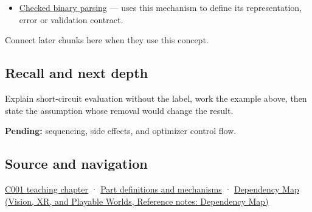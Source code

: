 \hypertarget{appendix-2e245a6fa8d3-used-by}{}

\begin{itemize}
\tightlist
\item
  \hyperref[appendix-652d81568de9]{Checked binary parsing} --- uses this mechanism to define its representation, error or validation contract.
\end{itemize}

Connect later chunks here when they use this concept.

\subsection{Recall and next depth}\label{appendix-2e245a6fa8d3-recall-and-next-depth}

\hypertarget{appendix-2e245a6fa8d3-recall-and-next-depth}{}

Explain short-circuit evaluation without the label, work the example above, then state the assumption whose removal would change the result.

\textbf{Pending:} sequencing, side effects, and optimizer control flow.

\subsection{Source and navigation}\label{appendix-2e245a6fa8d3-source-and-navigation}

\hypertarget{appendix-2e245a6fa8d3-source-and-navigation}{}

\hyperref[01-foundations-i-ch001-from-a-signal-to-an-interpretation]{C001 teaching chapter} · \hyperref[appendix-fd090d982a15]{Part definitions and mechanisms} · \href{../07-Vision-XR-and-Playable-Worlds/main.pdf\#nameddest=appendix-4ad47bdd269a}{Dependency Map (Vision, XR, and Playable Worlds, Reference notes: Dependency Map)}
